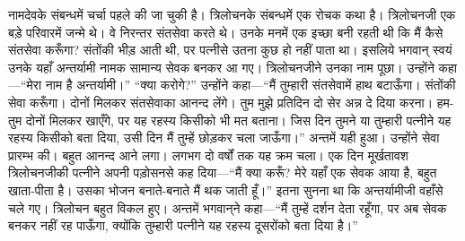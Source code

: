 \begin{sloppypar}\justifying{}
नामदेवके संबन्धमें चर्चा पहले की जा चुकी है। त्रिलोचनके संबन्धमें एक रोचक कथा है। त्रिलोचनजी एक बड़े परिवारमें जन्मे थे। वे निरन्तर संत\-सेवा करते थे। उनके मनमें एक इच्छा बनी रहती थी कि मैं कैसे संत\-सेवा करूँगा? संतोंकी भीड़ आती थी, पर पत्नीसे उतना कुछ हो नहीं पाता था। इसलिये भगवान् स्वयं उनके यहाँ अन्तर्यामी नामक सामान्य सेवक बनकर आ गए। त्रिलोचनजीने उनका नाम पूछा। उन्होंने कहा—“मेरा नाम है अन्तर्यामी।” “क्या करोगे?” उन्होंने कहा—“मैं तुम्हारी संत\-सेवामें हाथ बटाऊँगा। संतोंकी सेवा करूँगा। दोनों मिलकर संत\-सेवाका आनन्द लेंगे। तुम मुझे प्रतिदिन दो सेर अन्न दे दिया करना। हम-तुम दोनों मिलकर खाएँगे, पर यह रहस्य किसीको भी मत बताना। जिस दिन तुमने या तुम्हारी पत्नीने यह रहस्य किसीको बता दिया, उसी दिन मैं तुम्हें छोड़कर चला जाऊँगा।” अन्तमें यही हुआ। उन्होंने सेवा प्रारम्भ की। बहुत आनन्द आने लगा। लगभग दो वर्षों तक यह क्रम चला। एक दिन मूर्खतावश त्रिलोचनजीकी पत्नीने अपनी पड़ोसनसे कह दिया—“मैं क्या करूँ? मेरे यहाँ एक सेवक आया है, बहुत खाता-पीता है। उसका भोजन बनाते-बनाते मैं थक जाती हूँ।” इतना सुनना था कि अन्तर्यामीजी वहाँसे चले गए। त्रिलोचन बहुत विकल हुए। अन्तमें भगवान्‌ने कहा—“मैं तुम्हें दर्शन देता रहूँगा, पर अब सेवक बनकर नहीं रह पाऊँगा, क्योंकि तुम्हारी पत्नीने यह रहस्य दूसरोंको बता दिया है।”
\end{sloppypar}


